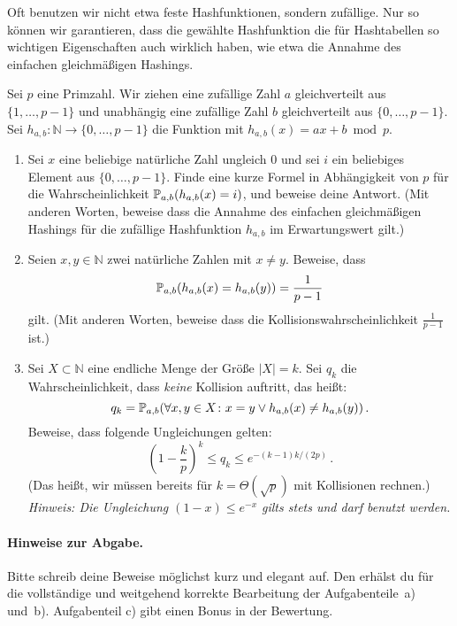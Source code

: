 \documentclass{uebung_cs}
\begin{document}
Oft benutzen wir nicht etwa feste Hashfunktionen, sondern zufällige.
Nur so können wir garantieren, dass die gewählte Hashfunktion die für Hashtabellen so wichtigen Eigenschaften auch wirklich haben, wie etwa die Annahme des einfachen gleichmäßigen Hashings.

Sei $p$ eine Primzahl.
Wir ziehen eine zufällige Zahl $a$ gleichverteilt aus $\{1,\dots,p-1\}$ und unabhängig eine zufällige Zahl $b$ gleichverteilt aus $\{0,\dots,p-1\}$.
Sei $h_{a,b}\colon\mathbb N\to\{0,\dots,p-1\}$ die Funktion mit $h_{a,b}(x)=ax+b\bmod p$.

\begin{enumerate}
    \item Sei $x$ eine beliebige natürliche Zahl ungleich $0$ und sei $i$ ein beliebiges Element aus $\{0,\dots,p-1\}$.
    Finde eine kurze Formel in Abhängigkeit von $p$ für die Wahrscheinlichkeit $\mathbb P_{a,b}(h_{a,b}(x)=i)$, und beweise deine Antwort. (Mit anderen Worten, beweise dass die Annahme des einfachen gleichmäßigen Hashings für die zufällige Hashfunktion $h_{a,b}$ im Erwartungswert gilt.)
    \item Seien $x,y\in\mathbb N$ zwei natürliche Zahlen mit $x\ne y$.
    Beweise, dass \[\mathbb P_{a,b}(h_{a,b}(x)=h_{a,b}(y))=\frac{1}{p-1}\] gilt. (Mit anderen Worten, beweise dass die Kollisionswahrscheinlichkeit $\frac{1}{p-1}$ ist.)
    \item Sei $X\subset\mathbb N$ eine endliche Menge der Größe $|X|=k$. Sei $q_k$ die Wahrscheinlichkeit, dass \emph{keine} Kollision auftritt, das heißt:
    \[q_k=\mathbb P_{a,b}(\forall x,y\in X\colon x=y \vee h_{a,b}(x)\ne h_{a,b}(y))\,.\]
    Beweise, dass folgende Ungleichungen gelten:
    \[
        \left(1-\frac{k}{p}\right)^k\le q_k \leq e^{-(k-1)k/(2p)}\,.
    \]
    (Das heißt, wir müssen bereits für $k=\Theta(\sqrt{p})$ mit Kollisionen rechnen.)\\
    \emph{Hinweis: Die Ungleichung $(1-x)\le e^{-x}$ gilts stets und darf benutzt werden.}
\end{enumerate}

\paragraph*{Hinweise zur Abgabe.}
Bitte schreib deine Beweise möglichst kurz und elegant auf.
Den  erhälst du für die vollständige und weitgehend korrekte Bearbeitung der Aufgabenteile~a) und~b). Aufgabenteil c) gibt einen Bonus in der Bewertung.
\end{document}
